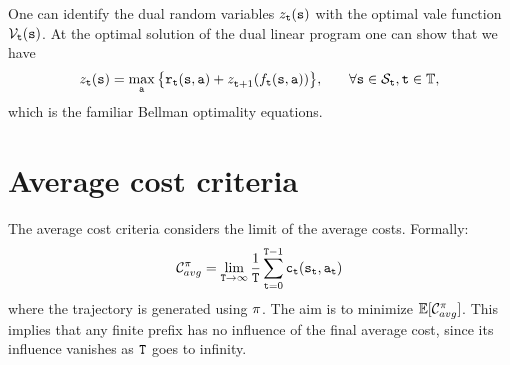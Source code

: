 \begin{leftbar}
One can identify the dual random variables $z_{\tt t}({\tt s})$ with
the optimal vale function $\mathcal{V}_{\tt t}({\tt s})$. At the optimal
solution of the dual linear program one can show that we have
\begin{align*}
 z_{{\tt t}}({\tt s}) &= \max_{\tt a} \big\{
{{{\tt r}_{{\tt t}}}({\tt s},{\tt a}) + z_{{\tt t} +
1}^{}({f_{{\tt t}}}({\tt s},{\tt a}))} \big\} , &\quad\forall {\tt s}
\in {\mathcal{S}_{{\tt t}}}, {\tt t}\in\mathbb{T},
\end{align*}
which is the familiar Bellman optimality equations.

%
%
%
%

\end{leftbar}

\section{Average cost criteria}

The average cost criteria considers the limit of the average costs.
Formally:
\[
\mathcal{C}_{avg}^\pi=\lim_{{\tt T}\rightarrow \infty}
\frac{1}{{\tt T}} \sum_{{\tt t}=0}^{{\tt T}-1}
{\tt c}_{\tt t}({\tt s}_{\tt t},{\tt a}_{\tt t})
\]
where the trajectory is generated using $\pi$. The aim is to
minimize $\mathbb{E}[\mathcal{C}^\pi_{avg}]$. This implies that any finite
prefix has no influence of the final average cost, since its
influence vanishes as ${\tt T}$ goes to infinity.

